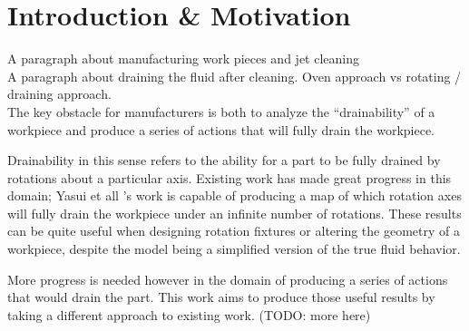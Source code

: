 							\chapter{Introduction \& Motivation}

A paragraph about manufacturing work pieces and jet cleaning
\\

A paragraph about draining the fluid after cleaning. Oven approach vs rotating / draining approach.
\\

The key obstacle for manufacturers is both to analyze the ``drainability'' of a workpiece and produce a series of actions that will fully drain the workpiece.

Drainability in this sense refers to the ability for a part to be fully drained by rotations about a particular axis. Existing work has made great progress in this domain; Yasui et all \cite{plot}'s work is capable of producing a map of which rotation axes will fully drain the workpiece under an infinite number of rotations. These results can be quite useful when designing rotation fixtures or altering the geometry of a workpiece, despite the model being a simplified version of the true fluid behavior.

More progress is needed however in the domain of producing a series of actions that would drain the part. This work aims to produce those useful results by taking a different approach to existing work. (TODO: more here)
